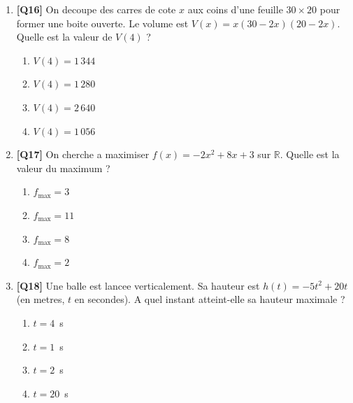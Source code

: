 \begin{enumerate}[resume]

\item \textbf{[Q16]} On decoupe des carres de cote $x$ aux coins d'une feuille $30 \times 20$
  pour former une boite ouverte. Le volume est $V(x) = x(30 - 2x)(20 - 2x)$.
  Quelle est la valeur de $V(4)$ ?

  \begin{enumerate}[label=\Alph*.]
    \item $V(4) = 1\,344$
    \item $V(4) = 1\,280$
    \item $V(4) = 2\,640$
    \item $V(4) = 1\,056$
  \end{enumerate}

\bigskip

\item \textbf{[Q17]} On cherche a maximiser $f(x) = -2x^2 + 8x + 3$ sur $\mathbb{R}$.
  Quelle est la valeur du maximum ?

  \begin{enumerate}[label=\Alph*.]
    \item $f_{\max} = 3$
    \item $f_{\max} = 11$
    \item $f_{\max} = 8$
    \item $f_{\max} = 2$
  \end{enumerate}

\bigskip

\item \textbf{[Q18]} Une balle est lancee verticalement. Sa hauteur est
  $h(t) = -5t^2 + 20t$ (en metres, $t$ en secondes).
  A quel instant atteint-elle sa hauteur maximale ?

  \begin{enumerate}[label=\Alph*.]
    \item $t = 4$~s
    \item $t = 1$~s
    \item $t = 2$~s
    \item $t = 20$~s
  \end{enumerate}

\end{enumerate}


\newpage

